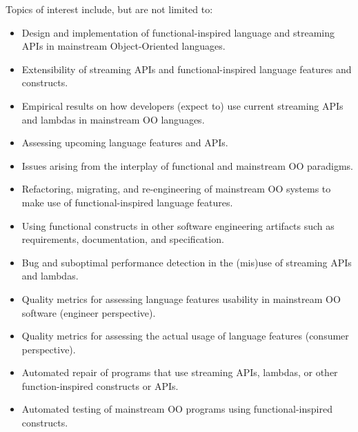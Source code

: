 \documentclass[10pt, conference]{IEEEtran}
\begin{document}

Topics of interest include, but are not limited to:

\begin{itemize}

	\item Design and implementation of functional-inspired language and streaming APIs in mainstream Object-Oriented languages.

	\item Extensibility of streaming APIs and functional-inspired language features and constructs.

	\item Empirical results on how developers (expect to) use current streaming APIs and lambdas in mainstream OO languages.

	\item Assessing upcoming language features and APIs.

	\item Issues arising from the interplay of functional and mainstream OO paradigms.

	\item Refactoring, migrating, and re-engineering of mainstream OO systems to make use of functional-inspired language features.

	\item Using functional
		constructs in other software engineering artifacts
		such as requirements, documentation, and specification.

	\item Bug and suboptimal performance detection in the (mis)use of streaming APIs and lambdas.

	\item Quality metrics for assessing 
		language features
		usability in mainstream OO software 
		(engineer perspective).

	\item Quality metrics for assessing the actual usage of 
		language features
		(consumer perspective).

	\item Automated repair of programs that use streaming APIs, lambdas, or other function-inspired constructs or APIs.

	\item Automated testing of mainstream OO programs using functional-inspired constructs.


\end{itemize}
\end{document}
